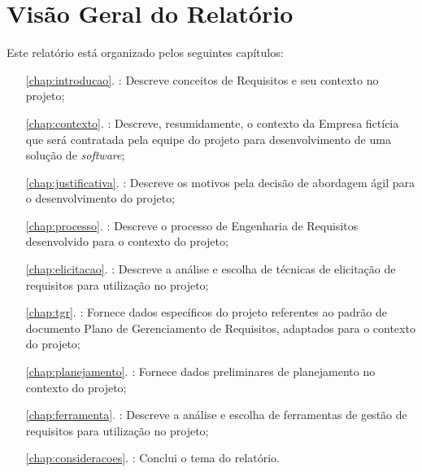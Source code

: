 	\section[Visão Geral do Relatório]{Visão Geral do Relatório}
	\label{sec:introducao_estrutura}
		Este relatório está organizado pelos seguintes capítulos:
		\begin{itemize}
			\item[\ref{chap:introducao}.]{\textbf{}: Descreve conceitos de Requisitos e seu contexto no projeto;}
			\item[\ref{chap:contexto}.]{\textbf{}: Descreve, resumidamente, o contexto da Empresa fictícia que será contratada pela equipe do projeto para desenvolvimento de uma solução de \emph{software};}
			\item[\ref{chap:justificativa}.]{\textbf{}: Descreve os motivos pela decisão de abordagem ágil para o desenvolvimento do projeto;}
			\item[\ref{chap:processo}.]{\textbf{}: Descreve o processo de Engenharia de Requisitos desenvolvido para o contexto do projeto;}
			\item[\ref{chap:elicitacao}.]{\textbf{}: Descreve a análise e escolha de técnicas de elicitação de requisitos para utilização no projeto;}
			\item[\ref{chap:tgr}.]{\textbf{}: Fornece dados específicos do projeto referentes ao padrão de documento Plano de Gerenciamento de Requisitos, adaptados para o contexto do projeto;}
			\item[\ref{chap:planejamento}.]{\textbf{}: Fornece dados preliminares de planejamento no contexto do projeto;}
			\item[\ref{chap:ferramenta}.]{\textbf{}: Descreve a análise e escolha de ferramentas de gestão de requisitos para utilização no projeto;}
			\item[\ref{chap:consideracoes}.]{\textbf{}: Conclui o tema do relatório.}
		\end{itemize}
